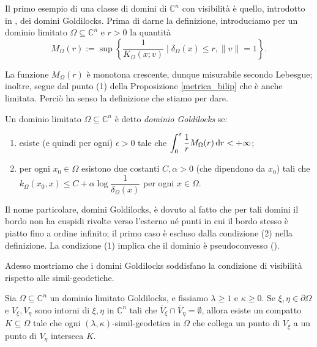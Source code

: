 Il primo esempio di una classe di domini di $\mathbb{C}^n$ con visibilità è quello, introdotto in \cite{BZ1}, dei domini Goldilocks. Prima di darne la definizione, introduciamo per un dominio limitato $\Omega\subseteq\mathbb{C}^n$ e $r>0$ la quantità
$$M_\Omega(r):=\sup\left\{\frac{1}{K_\Omega(x;v)}\mid \delta_\Omega(x) \le r, \|v\|=1\right\}.$$

La funzione $M_\Omega(r)$ è monotona crescente, dunque misurabile secondo Lebesgue; inoltre, segue dal punto (1) della Proposizione \ref{metrica_bilip} che è anche limitata. Perciò ha senso la definizione che stiamo per dare.

\begin{defn} \label{gold}
    Un dominio limitato $\Omega\subseteq\mathbb{C}^n$ è detto \textit{dominio Goldilocks} se:
    \begin{enumerate}[label={(\arabic*)}]
        \item esiste (e quindi per ogni) $\epsilon>0$ tale che $\displaystyle\int_0^{\varepsilon} \frac{1}{r}M_\Omega(r)\mathop{}\!\mathrm{d} r<+\infty$;
        \item per ogni $x_0\in\Omega$ esistono due costanti $C,\alpha>0$ (che dipendono da $x_0$) tali che $k_\Omega(x_0,x) \le C+\alpha\log{\dfrac{1}{\delta_\Omega(x)}}$ per ogni $x\in\Omega$.
    \end{enumerate}
\end{defn}

\begin{oss}
    Il nome particolare, domini Goldilocks, è dovuto al fatto che per tali domini il bordo non ha cuspidi rivolte verso l'esterno né punti in cui il bordo stesso è piatto fino a ordine infinito; il primo caso è escluso dalla condizione (2) nella definizione. La condizione (1) implica che il dominio è pseudoconvesso (\cite[Section 2, Paragraph 2.4]{BZ1}).
\end{oss}

Adesso mostriamo che i domini Goldilocks soddisfano la condizione di visibilità rispetto alle simil-geodetiche.

\begin{thm}
    Sia $\Omega\subseteq\mathbb{C}^n$ un dominio limitato Goldilocks, e fissiamo $\lambda\ge 1$ e $\kappa\ge 0$. Se $\xi,\eta\in\partial\Omega$ e $V_\xi,V_\eta$ sono intorni di $\xi,\eta$ in $\mathbb{C}^n$ tali che $\overline{V}_\xi\cap\overline{V}_\eta=\emptyset$, allora esiste un compatto $K\subseteq\Omega$ tale che ogni $(\lambda,\kappa)$-simil-geodetica in $\Omega$ che collega un punto di $V_\xi$ a un punto di $V_\eta$ interseca $K$.
\end{thm}

